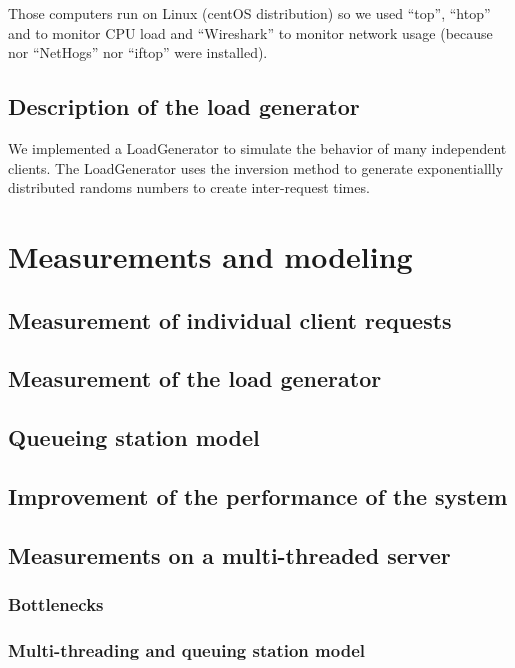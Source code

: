 Those computers run on Linux (centOS distribution) so we used \enquote{top},
\enquote{htop} and  to monitor CPU load and \enquote{Wireshark}
to monitor network usage (because nor \enquote{NetHogs} nor \enquote{iftop} were
installed). \newline

\subsection{Description of the load generator}
\label{sub:Description of the load generator}
We implemented a LoadGenerator to simulate the behavior of many independent
clients. The LoadGenerator uses the inversion method to generate exponentiallly
distributed randoms numbers to create inter-request times.

\section{Measurements and modeling}
\label{sec:Measurements and modeling}

\subsection{Measurement of individual client requests}
\label{sub:Measurement of individual client requests}

\subsection{Measurement of the load generator}
\label{sub:Measurement of the load generator}

\subsection{Queueing station model}
\label{sub:Queueing station model}

\subsection{Improvement of the performance of the system}
\label{sub:Improvement of the performance of the system}

\subsection{Measurements on a multi-threaded server}
\label{sub:Measurements on a multi-threaded server}

\subsubsection{Bottlenecks}
\label{subs:Bottlenecks}


\subsubsection{Multi-threading and queuing station model}
\label{subs:Multi-threading and queuing station model}
